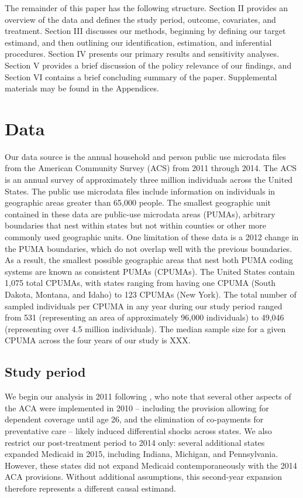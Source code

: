 \documentclass[12pt]{article}
\begin{document}
The remainder of this paper has the following structure. Section II provides an overview of the data and defines the study period, outcome, covariates, and treatment. Section III discusses our methods, beginning by defining our target estimand, and then outlining our identification, estimation, and inferential procedures. Section IV presents our primary results and sensitivity analyses. Section V provides a brief discussion of the policy relevance of our findings, and Section VI contains a brief concluding summary of the paper. Supplemental materials may be found in the Appendices.

\section{Data}

Our data source is the annual household and person public use microdata files from the American Community Survey (ACS) from 2011 through 2014. The ACS is an annual survey of approximately three million individuals across the United States. The public use microdata files include information on individuals in geographic areas greater than 65,000 people. The smallest geographic unit contained in these data are public-use microdata areas (PUMAs), arbitrary boundaries that nest within states but not within counties or other more commonly used geographic units. One limitation of these data is a 2012 change in the PUMA boundaries, which do not overlap well with the previous boundaries. As a result, the smallest possible geographic areas that nest both PUMA coding systems are known as consistent PUMAs (CPUMAs). The United States contain 1,075 total CPUMAs, with states ranging from having one CPUMA (South Dakota, Montana, and Idaho) to 123 CPUMAs (New York). The total number of sampled individuals per CPUMA in any year during our study period ranged from 531 (representing an area of approximately 96,000 individuals) to 49,046 (representing over 4.5 million individuals). The median sample size for a given CPUMA across the four years of our study is XXX.

\subsection{Study period}

We begin our analysis in 2011 following \cite{courtemanche2017early}, who note that several other aspects of the ACA were implemented in 2010 -- including the provision allowing for dependent coverage until age 26, and the elimination of co-payments for preventative care -- likely induced differential shocks across states. We also restrict our post-treatment period to 2014 only: several additional states expanded Medicaid in 2015, including Indiana, Michigan, and Pennsylvania. However, these states did not expand Medicaid contemporaneously with the 2014 ACA provisions. Without additional assumptions, this second-year expansion therefore represents a different causal estimand. 
\end{document}
